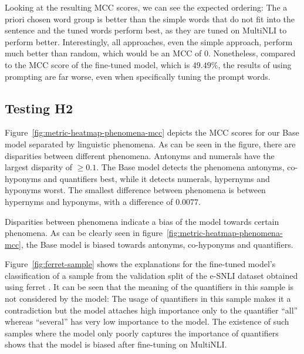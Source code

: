 Looking at the resulting \ac{MCC} scores, we can see the expected ordering: The a priori chosen word group is better than the simple words that do not fit into the sentence and the tuned words perform best, as they are tuned on \ac{MultiNLI} to perform better. Interestingly, all approaches, even the simple approach, perform much better than random, which would be an \ac{MCC} of $0$. Nonetheless, compared to the \ac{MCC} score of the fine-tuned model, which is $49.49\%$, the results of using prompting are far worse, even when specifically tuning the prompt words.

\subsection{Testing H2}
Figure~\ref{fig:metric-heatmap-phenomena-mcc} depicts the \acs{MCC} scores for our Base model separated by linguistic phenomena. As can be seen in the figure, there are disparities between different phenomena. Antonyms and numerals have the largest disparity of $\geq 0.1$. The Base model detects the phenomena antonyms, co-hyponyms and quantifiers best, while it detects numerals, hypernyms and hyponyms worst. The smallest difference between phenomena is between hypernyms and hyponyms, with a difference of $0.0077$.

Disparities between phenomena indicate a bias of the model towards certain phenomena. As can be clearly seen in figure~\ref{fig:metric-heatmap-phenomena-mcc}, the Base model is biased towards antonyms, co-hyponyms and quantifiers.

Figure~\ref{fig:ferret-sample} shows the explanations for the fine-tuned model's classification of a sample from the validation split of the \ac{e-SNLI} dataset obtained using ferret \cite{ferret}. It can be seen that the meaning of the quantifiers in this sample is not considered by the model: The usage of quantifiers in this sample makes it a contradiction but the model attaches high importance only to the quantifier \enquote{all} whereas \enquote{several} has very low importance to the model. The existence of such samples where the model only poorly captures the importance of quantifiers shows that the model is biased after fine-tuning on \ac{MultiNLI}.

